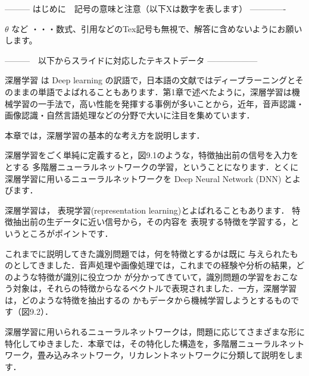 --------- はじめに　記号の意味と注意（以下Xは数字を表します） -------------

$\theta$ など       ・・・数式、引用などのTex記号も無視で、解答に含めないようにお願いします。
\cite{mitchell97}

---------　以下からスライドに対応したテキストデータ ------------------


深層学習
は
Deep learning
の訳語で，日本語の文献ではディープラーニングとそのままの単語でよばれることもあります．第1章で述べたように，深層学習は機械学習の一手法で，高い性能を発揮する事例が多いことから，近年，音声認識・画像認識・自然言語処理などの分野で大いに注目を集めています．

本章では，深層学習の基本的な考え方を説明します．

深層学習をごく単純に定義すると，図9.1のような，特徴抽出前の信号を入力をとする
多階層ニューラルネットワークの学習，ということになります．とくに深層学習に用いるニューラルネットワークを
Deep Neural Network (DNN) 
とよびます．

深層学習は，
表現学習(representation learning)とよばれることもあります．
特徴抽出前の生データに近い信号から，その内容を
表現する特徴を学習する，というところがポイントです．


これまでに説明してきた識別問題では，何を特徴とするかは既に
与えられたものとしてきました．音声処理や画像処理では，これまでの経験や分析の結果，どのような特徴が識別に役立つか
が分かってきていて，識別問題の学習をおこなう対象は，それらの特徴からなるベクトルで表現されました．一方，深層学習は，どのような特徴を抽出するの
かもデータから機械学習しようとするものです（図9.2）．


深層学習に用いられるニューラルネットワークは，問題に応じてさまざまな形に特化してゆきました．本章では，その特化した構造を，多階層ニューラルネットワーク，畳み込みネットワーク，リカレントネットワークに分類して説明をします．


